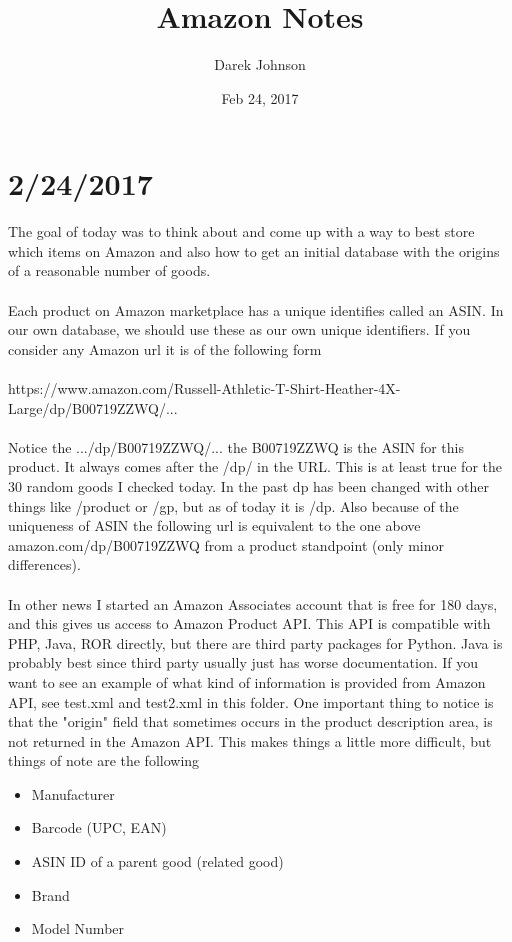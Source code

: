 \documentclass[12pt]{article}
\title{Amazon Notes}
\author{Darek Johnson}
\date{Feb 24, 2017}
\begin{document}

\maketitle

\section*{2/24/2017}
The goal of today was to think about and come up with a way to best store which items on Amazon and also how to get an initial database with the origins of a reasonable number of goods. \\\\
Each product on Amazon marketplace has a unique identifies called an ASIN. In our own database, we should use these as our own unique identifiers. If you consider any Amazon url it is of the following form\\\\
https://www.amazon.com/Russell-Athletic-T-Shirt-Heather-4X-Large/dp/B00719ZZWQ/... \\\\
Notice the .../dp/B00719ZZWQ/... the B00719ZZWQ is the ASIN for this product. It always comes after the /dp/ in the URL. This is at least true for the 30 random goods I checked today. In the past dp has been changed with other things like /product or /gp, but as of today it is /dp. Also because of the uniqueness of ASIN the following url is equivalent to the one above amazon.com/dp/B00719ZZWQ from a product standpoint (only minor differences). \\\\
In other news I started an Amazon Associates account that is free for 180 days, and this gives us access to Amazon Product API. This API is compatible with PHP, Java, ROR directly, but there are third party packages for Python. Java is probably best since third party usually just has worse documentation. If you want to see an example of what kind of information is provided from Amazon API, see test.xml and test2.xml in this folder. One important thing to notice is that the "origin" field that sometimes occurs in the product description area, is not returned in the Amazon API. This makes things a little more difficult, but things of note are the following

\begin{itemize}
	\item Manufacturer 
	\item Barcode (UPC, EAN)
	\item ASIN ID of a parent good (related good)
	\item Brand 
	\item Model Number
\end{itemize}
\end{document}
